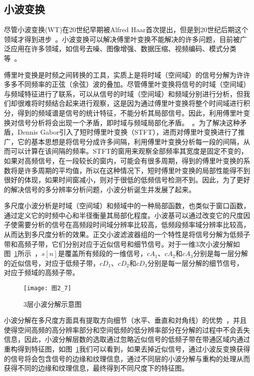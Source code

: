 \subsection{小波变换}
\label{2_2_3}

尽管小波变换(WT)在20世纪早期被Alfred Haar首次提出，但是到20世纪后期这个领域才得到进步~\cite{Merry2013wavelet}。小波变换可以解决傅里叶变换不能解决的许多问题，目前被广泛应用在许多领域，如信号去噪、图像增强、数据压缩、视频编码、模式分类等~\cite{ImamogluTMM2013wavelet}。

傅里叶变换是时频之间转换的工具，实质上是将时域（空间域）的信号分解为许许多多不同频率的正弦（余弦）波的叠加。尽管傅里叶变换将信号的时域（空间域）与频域特征进行了联系，可以从信号的时域（空间域）和频域分别进行分析，但我们却很难将时频结合起来进行观察，这是因为通过傅里叶变换将整个时间域进行积分，得到的频域谱是信号的统计特征，不能分析其局部信号。因此，利用傅里叶变换对信号分析将会出现一个矛盾，即时域与频域局部化矛盾。~\cite{Merry2013wavelet,Fugal2009book,Kocyigit2013EMG,Semmlow2004book}。为了解决这种矛盾，Dennis Gabor引入了短时傅里叶变换（STFT），进而对傅里叶变换进行了推广，它的基本思想是将信号分成许多间隔，利用傅里叶变换分析每一段的间隔，从而可以计算在该间隔的频率。STFT的窗用来观察全部频率其宽度是固定不变的，如果对高频信号，在一段较长的窗内，可能会有很多周期，得到的傅里叶变换的系数将是许多周期的平均值，所以在这种情况下，短时傅里叶变换的局部性能得不到很好的体现，如果时间窗减小，则对于很低的低频信号检测不到。因此，为了更好的解决信号的多分辨率分析问题，小波分析诞生并发展了起来。

多尺度小波分析是时域（空间域）和频域中的一种局部函数，也类似于窗口函数，通过定义它的时频中心和半径衡量其局部化程度。小波基可以通过改变它的尺度因子使需要分析的信号在高频段时间域分辨率比较高，低频段频率域分辨率比较高，从而达到多尺度分析的效果。正交小波滤波器组的一个特性是将信号分解为低频子带和高频子带，它们分别对应于近似信号和细节信号。对于一维3次小波分解如图~\ref{图2_7}所示~\cite{Fugal2009book}，$s[n]$是覆盖所有频段的一维信号，$cA_{1}$、$cA_{2}$和$cA_{3}$分别是每一层分解的近似信号，对应于低频子带，$cD_{1}$、$cD_{2}$和$cD_{3}$分别是每一层分解的细节信号，对应于频域的高频子带。
\begin{figure}[t] %
  \centering
  \texttt{[image: 图2\_7]}
  \caption{3层小波分解示意图}
  \label{图2_7}
\end{figure}

小波分解在多尺度方面具有提取方向细节（水平、垂直和対角线）的优势~\cite{Merry2013wavelet,Semmlow2004book}，并且使得空间高频的高分辨率部分和空间低频的低分辨率部分在分解的过程中不会丢失信息，因此，小波分解层数的选取通过忽略近似信号的低频子带在带通区域内通过重构得到特征图，如图~\ref{图2_7}我们可以看到，如果去掉近似信号，通过小波反变换获得的信号将会包含信号的边缘和纹理信息，通过不同层的小波分解与重构的处理从而获得不同的边缘和纹理信息，最终得到不同尺度下的特征图。

